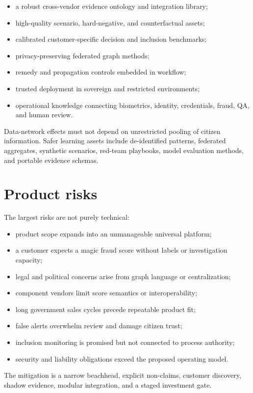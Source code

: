 \begin{itemize}
\item a robust cross-vendor evidence ontology and integration library;
\item high-quality scenario, hard-negative, and counterfactual assets;
\item calibrated customer-specific decision and inclusion benchmarks;
\item privacy-preserving federated graph methods;
\item remedy and propagation controls embedded in workflow;
\item trusted deployment in sovereign and restricted environments;
\item operational knowledge connecting biometrics, identity, credentials, fraud, QA, and human review.
\end{itemize}

Data-network effects must not depend on unrestricted pooling of citizen information. Safer learning assets include de-identified patterns, federated aggregates, synthetic scenarios, red-team playbooks, model evaluation methods, and portable evidence schemas.

\section{Product risks}

The largest risks are not purely technical:

\begin{itemize}
\item product scope expands into an unmanageable universal platform;
\item a customer expects a magic fraud score without labels or investigation capacity;
\item legal and political concerns arise from graph language or centralization;
\item component vendors limit score semantics or interoperability;
\item long government sales cycles precede repeatable product fit;
\item false alerts overwhelm review and damage citizen trust;
\item inclusion monitoring is promised but not connected to process authority;
\item security and liability obligations exceed the proposed operating model.
\end{itemize}

The mitigation is a narrow beachhead, explicit non-claims, customer discovery, shadow evidence, modular integration, and a staged investment gate.


